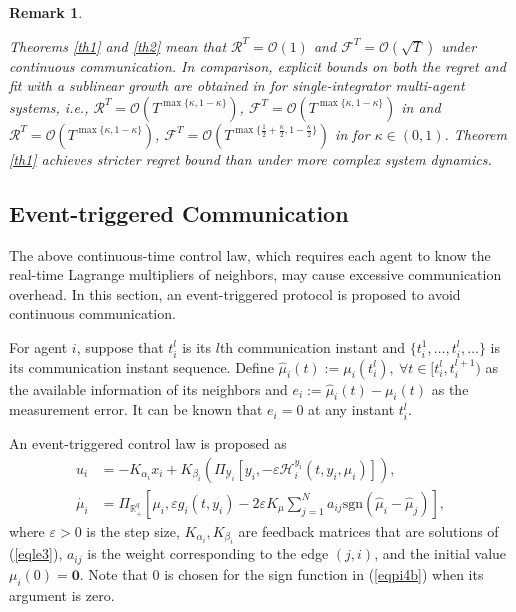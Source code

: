 \documentclass[letterpaper, 10 pt, conference]{ieeeconf}  %
\newtheorem{remark}{ {Remark}}
\newcommand{\sign}[1]{\mathrm{sgn}(#1)}
\begin{document}
\begin{remark}\label{remark2}
	
	Theorems \ref{th1} and \ref{th2} mean that $\mathcal{R}^T=\mathcal{O}(1)$ and $\mathcal{F}^T = \mathcal{O}(\sqrt{T})$ under continuous communication.
	In comparison, explicit bounds on both the regret and fit with a sublinear growth are obtained in \cite{yi2020,li2022} for single-integrator multi-agent systems, i.e., $\mathcal{R}^T=\mathcal{O}(T^{\max\{\kappa,1-\kappa\}})$, $\mathcal{F}^T = \mathcal{O}(T^{\max\{\kappa,1-\kappa\}})$ in \cite{yi2020} and $\mathcal{R}^T= \mathcal{O}(T^{\max\{\kappa,1-\kappa\}})$, $\mathcal{F}^T = \mathcal{O}(T^{\max\{\frac{1}{2}+\frac{\kappa}{2},1-\frac{\kappa}{2}\}})$ in \cite{li2022} for $\kappa\in(0,1)$. Theorem \ref{th1} achieves stricter regret bound than \cite{yi2020,li2022} under more complex system dynamics.
\end{remark}

\subsection{Event-triggered Communication}
The above continuous-time control law, which requires each agent to know the real-time Lagrange multipliers of neighbors, may cause excessive communication overhead. 
In this section, an event-triggered protocol is proposed to avoid continuous communication.

For agent $i$, suppose that $t_i^l$ is its $l$th communication instant and $\{t_i^1, \dots, t_i^l, \dots\}$ is its communication instant sequence. Define $\hat{\mu}_i(t)\!:=\! \mu_i(t_i^l), ~\forall t\!\in\! [t_i^l,t_i^{l+1})$ as the available information of its neighbors and $e_i\!:=\!\hat \mu_i(t)-\mu_i(t)$ as the measurement error. It can be known  that $e_i=0$ at any instant  $t_i^l$.

An event-triggered control law is proposed as
\begin{subequations}\label{eqpi4}
	\begin{align}
		u_i&=-K_{\alpha_i} x_i+K_{\beta_i} \left(\Pi_{\mathcal{Y}_i}[y_i, -\varepsilon\mathcal{H}_i^{y_i}(t,y_i,\mu_i)]\right),\label{eqpi4a}\\
		\dot{\mu_i}&=\Pi_{\mathbb{R}_+^q}[\mu_i,\varepsilon g_i(t,y_i)-2\varepsilon K_\mu \sum_{j=1}^N a_{ij}\sign{\hat\mu_i-\hat\mu_j}], \label{eqpi4b}
	\end{align}
\end{subequations}
where $\varepsilon>0$ is the step size, $K_{\alpha_i},K_{\beta_i}$ are feedback matrices that are solutions of (\ref{eqle3}), $a_{ij}$ is the weight corresponding to the edge $(j,i)$, and the initial value $\mu_i(0)=\boldsymbol{0}$. Note that $0$ is chosen for the sign function in (\ref{eqpi4b}) when its argument is zero.
\end{document}
